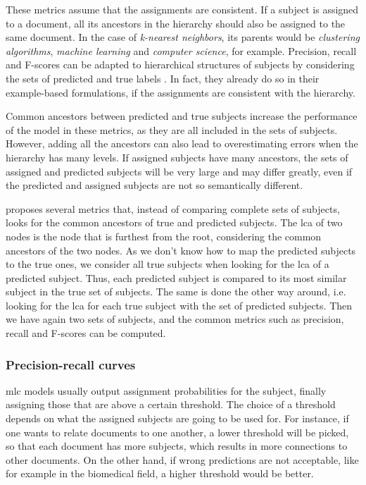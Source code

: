 These metrics assume that the assignments are consistent. If a subject is assigned to a document, all its ancestors in the hierarchy should also be assigned to the same document. In the case of \textit{k-nearest neighbors}, its parents would be \textit{clustering algorithms}, \textit{machine learning} and \textit{computer science}, for example. Precision, recall and F-scores can be adapted to hierarchical structures of subjects by considering the sets of predicted and true labels \cite{gargiulo2019deep}. In fact, they already do so in their example-based formulations, if the assignments are consistent with the hierarchy.

Common ancestors between predicted and true subjects increase the performance of the model in these metrics, as they are all included in the sets of subjects. However, adding all the ancestors can also lead to overestimating errors when the hierarchy has many levels. If assigned subjects have many ancestors, the sets of assigned and predicted subjects will be very large and may differ greatly, even if the predicted and assigned subjects are not so semantically different.

\cite{kosmopoulos2015evaluation} proposes several metrics that, instead of comparing complete sets of subjects, looks for the common ancestors of true and predicted subjects. The \acrfull{lca} of two nodes is the node that is furthest from the root, considering the common ancestors of the two nodes. As we don't know how to map the predicted subjects to the true ones, we consider all true subjects when looking for the \acrshort{lca} of a predicted subject. Thus, each predicted subject is compared to its most similar subject in the true set of subjects. The same is done the other way around, i.e. looking for the \acrshort{lca} for each true subject with the set of predicted subjects. Then we have again two sets of subjects, and the common metrics such as precision, recall and F-scores can be computed.

\subsubsection{Precision-recall curves} \label{eval_metrics_curve}

\acrfull{mlc} models usually output assignment probabilities for the subject, finally assigning those that are above a certain threshold. The choice of a threshold depends on what the assigned subjects are going to be used for. For instance, if one wants to relate documents to one another, a lower threshold will be picked, so that each document has more subjects, which results in more connections to other documents. On the other hand, if wrong predictions are not acceptable, like for example in the biomedical field, a higher threshold would be better.

